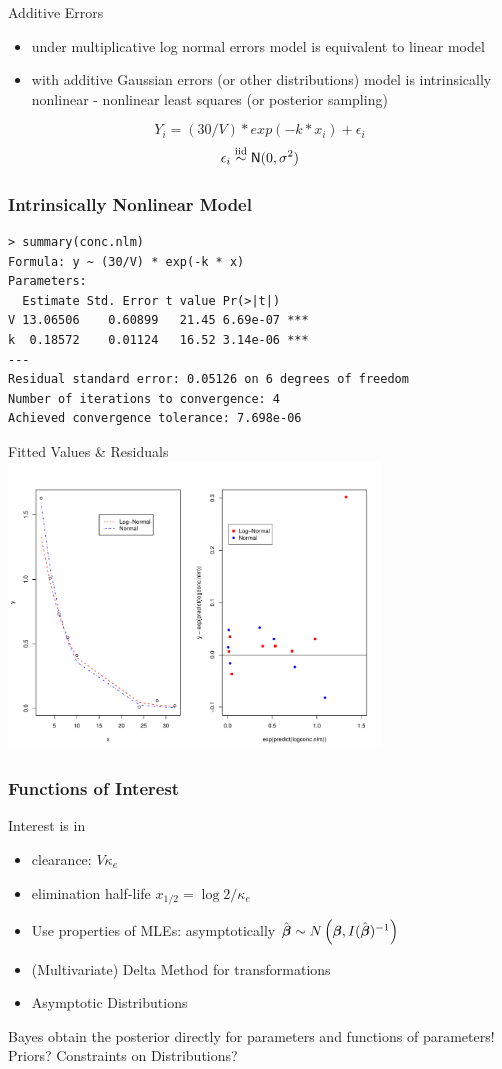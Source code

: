 \documentclass[handout]{beamer}
\begin{document}
\begin{frame} {Additive Errors}
  \begin{itemize}
  \item  under  multiplicative log normal errors model is equivalent
    to linear model \pause
  \item with additive Gaussian errors (or other distributions) model
    is intrinsically nonlinear - nonlinear least squares (or posterior
    sampling) \pause
  \end{itemize}
$$ Y_i = (30/V) * exp(-k * x_i) + \epsilon_i$$ \pause
$$\epsilon_i \mathrel{\mathop{\sim}\limits^{\rm iid}} \textsf{N}(0, \sigma^2)$$ 
\end{frame}
\begin{frame}[fragile]\frametitle{Intrinsically Nonlinear Model}
\begin{verbatim}
> summary(conc.nlm)
Formula: y ~ (30/V) * exp(-k * x)
Parameters:
  Estimate Std. Error t value Pr(>|t|)    
V 13.06506    0.60899   21.45 6.69e-07 ***
k  0.18572    0.01124   16.52 3.14e-06 ***
---
Residual standard error: 0.05126 on 6 degrees of freedom
Number of iterations to convergence: 4 
Achieved convergence tolerance: 7.698e-06
\end{verbatim}
\end{frame}
\begin{frame} {Fitted Values \& Residuals}
  \includegraphics[height=3in]{nonlinear}
\end{frame}

\begin{frame} \frametitle{Functions of Interest}
Interest is in
\begin{itemize}
\item clearance: $V \kappa_e$ \pause
\item elimination half-life $x_{1/2} = \log 2/\kappa_e$ \pause
\end{itemize}

  \begin{itemize}
  \item   Use properties of MLEs: asymptotically  $\hat{\boldsymbol{\beta}} \sim N\left(\boldsymbol{\beta},
    I(\hat{\boldsymbol{\beta}})^{-1}\right)$ \pause
  \item (Multivariate) Delta Method for transformations  \pause
\item Asymptotic Distributions
  \end{itemize}

Bayes obtain the posterior directly for parameters and functions of parameters!    Priors?  Constraints on Distributions?
\end{frame}
\end{document}
